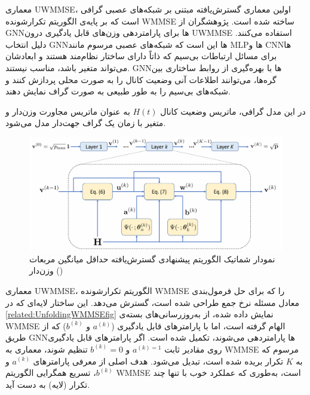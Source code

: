 	معماری 
\gls{UWMMSE}،
	 اولین معماری گسترش‌یافته مبتنی بر شبکه‌های عصبی گرافی است که بر پایه‌ی الگوریتم تکرارشونده 
\gls{WMMSE}
	  ساخته شده است. پژوهشگران از
\gls{GNN}ها
	   برای پارامتردهی وزن‌های قابل یادگیری درون 
\gls{UWMMSE}
	    استفاده می‌کنند. دلیل انتخاب 
\gls{GNN}ها
	    این است که شبکه‌های عصبی مرسوم مانند 
\gls{MLP}ها
	     و 
\gls{CNN}ها
	     برای مسائل ارتباطات بی‌سیم که ذاتاً دارای ساختار نظام‌مند هستند و ابعادشان می‌تواند متغیر باشد، مناسب نیستند.
\gls{GNN}ها
	     با بهره‌گیری از روابط ساختاری بین گره‌ها، می‌توانند اطلاعات آنی وضعیت کانال را به صورت محلی پردازش کنند و شبکه‌های بی‌سیم را به طور طبیعی به صورت گراف نمایش دهند.
	     
	     
	      در این مدل گرافی، ماتریس وضعیت کانال 
$H(t)$
	      به عنوان ماتریس مجاورت وزن‌دار و متغیر با زمان یک گراف جهت‌دار مدل می‌شود.
\begin{figure}
  	\centering
  	\includegraphics[width=0.7\linewidth]{./Pic/UnfoldedWMMSE_related_fig}
  	\caption[ نمودار شماتیک الگوریتم پیشنهادی گسترش‌یافته حداقل میانگین مربعات وزن‌دار ()]{نمودار شماتیک الگوریتم پیشنهادی گسترش‌یافته حداقل میانگین مربعات وزن‌دار () \cite{UnfoldingWMMSE}}
  	\label{related:UnfoldingWMMSEfig}
\end{figure}
	معماری 
\gls{UWMMSE}،
	 الگوریتم تکرارشونده 
\gls{WMMSE}
	  را که برای حل فرمول‌بندی معادل مسئله نرخ جمع طراحی شده است، گسترش می‌دهد. این ساختار لایه‌ای که در
\autoref{related:UnfoldingWMMSEfig}
	  نمایش داده شده، از به‌روزرسانی‌های بسته‌ی 
\gls{WMMSE}
	   الهام گرفته است، اما با پارامترهای قابل یادگیری 
($a^{(k)}$ و $b^{(k)}$)
	    که از طریق
\gls{GNN}ها
	    پارامتردهی می‌شوند، تکمیل شده است. اگر پارامترهای قابل یادگیری روی مقادیر ثابت
$a^{(k) = 1}$ و $b^{(k)} = 0$
	     تنظیم شوند، معماری به 
\gls{WMMSE}
	      مرسوم که به 
$K$
	       تکرار بریده شده است، تبدیل می‌شود. هدف اصلی از معرفی پارامترهای  
$a^{(k)}$ و $b^{(k)}$،
 تسریع همگرایی الگوریتم 
\gls{WMMSE}
  است، به‌طوری که عملکرد خوب با تنها چند تکرار (لایه) به دست آید.
  
